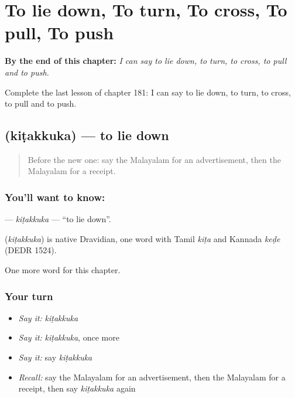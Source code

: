 
\chapter{To lie down, To turn, To cross, To pull, To push}
\label{ch:ml-to-lie-down-to-turn-to-cross-to-pull-to-push}

\begin{chapteropening}
\textbf{By the end of this chapter:} \emph{I can say to lie down, to turn, to cross, to pull and to push.}

Complete the last lesson of chapter 181: I can say to lie down, to turn, to cross, to pull and to push.
\end{chapteropening}

\section[\texorpdfstring{\ml{കിടക്കുക} (kiṭakkuka)}{കിടക്കുക (kiṭakkuka)}]{ (kiṭakkuka) — to lie down}

\label{lesson:ML-C181-kitakkuka}



\begin{quote}
Before the new one: say the Malayalam for an advertisement, then the Malayalam for a receipt.
\end{quote}

\subsection*{You'll want to know: }
\textbf{} — \emph{kiṭakkuka} — \textquotedblleft{}to lie down\textquotedblright{}.

\begin{cousinweb}
\textbf{} (\emph{kiṭakkuka}) is native Dravidian, one word with Tamil \emph{kiṭa} and Kannada \emph{keḍe} (DEDR 1524).
\end{cousinweb}

\begin{grammarlens}[title={What you've built}]
One more word for this chapter.
\end{grammarlens}

\subsection*{Your turn}
\begin{itemize}
\raggedright
  \item \emph{Say it:} \emph{kiṭakkuka}
  \item \emph{Say it:} \emph{kiṭakkuka}, once more
  \item \emph{Say it:} say \emph{kiṭakkuka}
  \item \emph{Recall:} say the Malayalam for an advertisement, then the Malayalam for a receipt, then say \emph{kiṭakkuka} again
\end{itemize}

